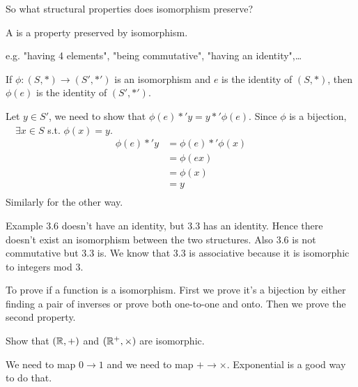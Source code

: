 \documentclass[class=article,crop=false]{standalone}
\begin{document}
So what structural properties does isomorphism preserve?
\begin{defn}
	A  is a property preserved by isomorphism. 
\end{defn}
\begin{note}[]
e.g. "having 4 elements", "being commutative", "having an identity",\ldots
\end{note}
\begin{thm}[]
	If $\phi:(S,*) \to (S',*')$ is an isomorphism and $e$ is the identity of  $(S,*)$, then  $\phi(e) $ is the identity of $(S',*')$.
\end{thm}
\begin{prf}
Let $y \in S'$, we need to show that $\phi(e) *' y = y*' \phi(e) $. Since $\phi$ is a bijection, $\quad \exists x \in S $ s.t. $\phi(x)=y $. 
\begin{align*}
	\phi(e)*'y&= \phi(e) *'\phi(x)   \\
		  &= \phi(ex)   \\ 
		  &= \phi(x)  \\
		  &= y \\
\end{align*}
Similarly for the other way.
\end{prf}

Example 3.6 doesn't have an identity, but 3.3 has an identity. Hence there doesn't exist an isomorphism between the two structures. Also 3.6 is not commutative but 3.3 is. We know that 3.3 is associative because it is isomorphic to integers mod 3.\\

\begin{note}[]
	To prove if a function is a isomorphism. First we prove it's a bijection by either finding a pair of inverses or prove both one-to-one and onto. Then we prove the second property.
\end{note}

\begin{eg}[]
	Show that $(\mathbb{R},+)$ and $(\mathbb{R}^+,\times)$ are isomorphic.
\end{eg}
\begin{intuition}
	We need to map $0 \to 1$ and we need to map $+ \to \times $. Exponential is a good way to do that.
\end{intuition}
\end{document}
